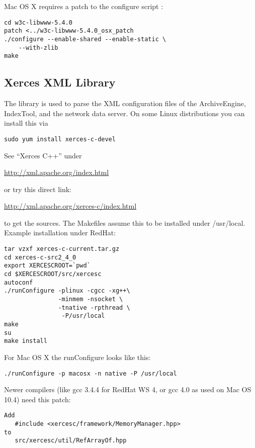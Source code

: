 \noindent Mac OS X requires a patch to the configure script \cite{darwinports}:
\begin{lstlisting}[keywordstyle=\sffamily]
cd w3c-libwww-5.4.0
patch <../w3c-libwww-5.4.0_osx_patch
./configure --enable-shared --enable-static \
    --with-zlib
make
\end{lstlisting}

\subsection{Xerces XML Library}
The  library is used to parse the XML configuration files of the
ArchiveEngine, IndexTool, and the network data server.
On some Linux distributions you can install this via
\begin{lstlisting}[keywordstyle=\sffamily]
sudo yum install xerces-c-devel
\end{lstlisting}
See ``Xerces C++'' under
\begin{center}
\href{http://xml.apache.org/index.html}{http://xml.apache.org/index.html}
\end{center}
or try this direct link:
\begin{center}
\href{http://xml.apache.org/xerces-c/index.html}
     {http://xml.apache.org/xerces-c/index.html}
\end{center}
to get the sources. The Makefiles assume this to be installed under /usr/local.
Example installation under RedHat:
\begin{lstlisting}[keywordstyle=\sffamily]
tar vzxf xerces-c-current.tar.gz 
cd xerces-c-src2_4_0
export XERCESCROOT=`pwd`
cd $XERCESCROOT/src/xercesc
autoconf
./runConfigure -plinux -cgcc -xg++\
               -minmem -nsocket \
               -tnative -rpthread \
                -P/usr/local
make
su
make install
\end{lstlisting}

\noindent For Mac OS X the runConfigure looks like this:
\begin{lstlisting}[keywordstyle=\sffamily]
./runConfigure -p macosx -n native -P /usr/local
\end{lstlisting}

\noindent Newer compilers (like gcc 3.4.4 for RedHat WS 4,
 or gcc 4.0 as used on Mac OS 10.4)
need this patch:
\begin{lstlisting}[keywordstyle=\sffamily]
Add
   #include <xercesc/framework/MemoryManager.hpp>
to
   src/xercesc/util/RefArrayOf.hpp
\end{lstlisting}

